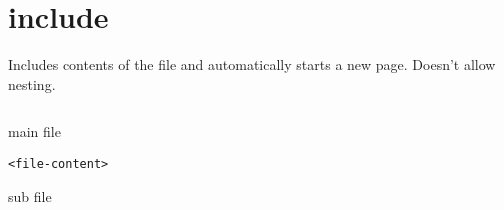 \documentclass[../../latex]{subfiles}
\begin{document}
\section{include}

Includes contents of the file and automatically starts a new page. Doesn't allow nesting.

\begin{minipage}{0.47 \textwidth}
  \begin{listing}[H]
    \begin{verbatim}

    \end{verbatim}
    \caption{main file}
  \end{listing}
\end{minipage}
\hfill
\begin{minipage}{0.47 \textwidth}
  \begin{listing}[H]
    \begin{verbatim}
<file-content>
    \end{verbatim}
    \caption{sub file}
  \end{listing}
\end{minipage}
\end{document}
